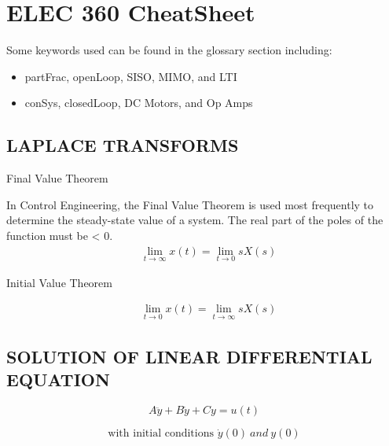 \chapter{ELEC 360 CheatSheet}
Some keywords used can be found in the glossary section including:
\begin{itemize}
	\item  \gls{partFrac}, \gls{openLoop}, \gls{SISO}, \gls{MIMO}, and \gls{LTI}
	\item  \gls{conSys}, \gls{closedLoop}, \gls{DC Motors}, and \gls{Op Amps}
\end{itemize}

\begin{multicols}{3}


\section{LAPLACE TRANSFORMS}

Final Value Theorem

In Control Engineering, the Final Value Theorem is used most frequently to determine the steady-state value of a system. The real part of the poles of the function must be < 0.
\begin{align}
& \lim\limits_{t \rightarrow \infty} x(t) = \lim\limits_{t \rightarrow 0} sX(s)
\end{align}


Initial Value Theorem

\begin{align}
& \lim\limits_{t \rightarrow 0} x(t) = \lim\limits_{t \rightarrow \infty} sX(s)
\end{align}


\section{SOLUTION OF LINEAR DIFFERENTIAL EQUATION}

\[A\ddot{y} + B\dot{y} + Cy = u\left( t \right)\]

\[\text{with initial conditions }\dot{y}\left( 0 \right)\ and \ y(0)\]


\end{multicols}
